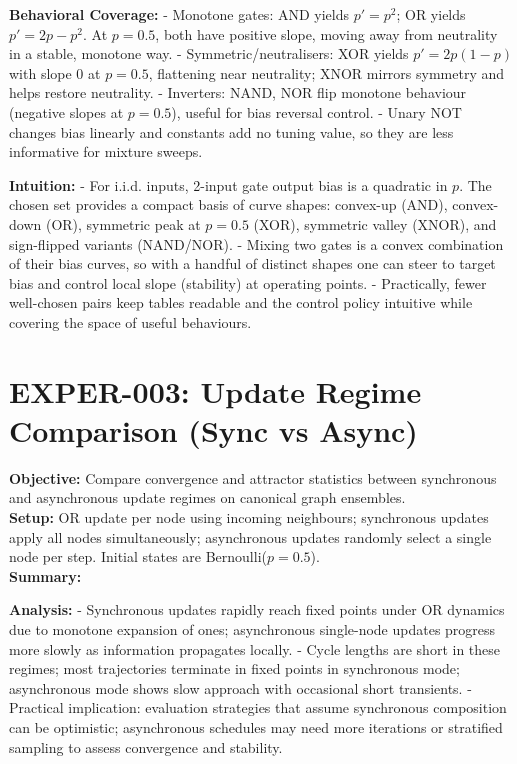 \documentclass[11pt]{article}
\begin{document}
\textbf{Behavioral Coverage:}
- Monotone gates: AND yields $p' = p^2$; OR yields $p' = 2p - p^2$. At $p=0.5$, both have positive slope, moving away from neutrality in a stable, monotone way.
- Symmetric/neutralisers: XOR yields $p' = 2p(1-p)$ with slope $0$ at $p=0.5$, flattening near neutrality; XNOR mirrors symmetry and helps restore neutrality.
- Inverters: NAND, NOR flip monotone behaviour (negative slopes at $p=0.5$), useful for bias reversal control.
- Unary NOT changes bias linearly and constants add no tuning value, so they are less informative for mixture sweeps.

\textbf{Intuition:}
- For i.i.d. inputs, 2-input gate output bias is a quadratic in $p$. The chosen set provides a compact basis of curve shapes: convex-up (AND), convex-down (OR), symmetric peak at $p=0.5$ (XOR), symmetric valley (XNOR), and sign-flipped variants (NAND/NOR).
- Mixing two gates is a convex combination of their bias curves, so with a handful of distinct shapes one can steer to target bias and control local slope (stability) at operating points.
- Practically, fewer well-chosen pairs keep tables readable and the control policy intuitive while covering the space of useful behaviours.




\section{EXPER-003: Update Regime Comparison (Sync vs Async)}
\textbf{Objective:} Compare convergence and attractor statistics between synchronous and asynchronous update regimes on canonical graph ensembles.\\
\textbf{Setup:} OR update per node using incoming neighbours; synchronous updates apply all nodes simultaneously; asynchronous updates randomly select a single node per step. Initial states are Bernoulli($p=0.5$).\\
\textbf{Summary:}\\
\begin{center}
\end{center}
\textbf{Analysis:}
- Synchronous updates rapidly reach fixed points under OR dynamics due to monotone expansion of ones; asynchronous single-node updates progress more slowly as information propagates locally.
- Cycle lengths are short in these regimes; most trajectories terminate in fixed points in synchronous mode; asynchronous mode shows slow approach with occasional short transients.
- Practical implication: evaluation strategies that assume synchronous composition can be optimistic; asynchronous schedules may need more iterations or stratified sampling to assess convergence and stability.
\end{document}
